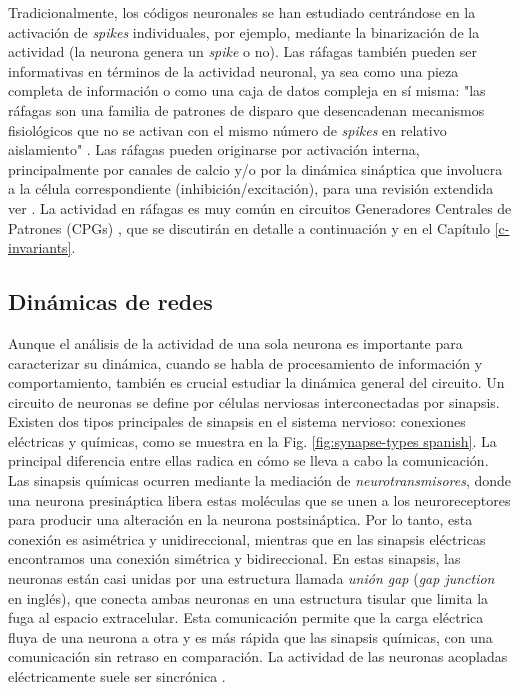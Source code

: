 Tradicionalmente, los códigos neuronales se han estudiado centrándose en la activación de \textit{spikes} individuales, por ejemplo, mediante la binarización de la actividad (la neurona genera un \textit{spike} o no). Las ráfagas también pueden ser informativas en términos de la actividad neuronal, ya sea como una pieza completa de información o como una caja de datos compleja en sí misma: "las ráfagas son una familia de patrones de disparo que desencadenan mecanismos fisiológicos que no se activan con el mismo número de \textit{spikes} en relativo aislamiento" \parencite{friedenberger_silences_2023}. Las ráfagas pueden originarse por activación interna, principalmente por canales de calcio y/o por la dinámica sináptica que involucra a la célula correspondiente (inhibición/excitación), para una revisión extendida ver \parencite{friedenberger_silences_2023}. La actividad en ráfagas es muy común en circuitos Generadores Centrales de Patrones (CPGs) \parencite{katz_evolution_2016,steuer_central_2018}, que se discutirán en detalle a continuación y en el Capítulo \ref{c-invariants}.

\subsection{Dinámicas de redes}

Aunque el análisis de la actividad de una sola neurona es importante para caracterizar su dinámica, cuando se habla de procesamiento de información y comportamiento, también es crucial estudiar la dinámica general del circuito. Un circuito de neuronas se define por células nerviosas interconectadas por sinapsis. Existen dos tipos principales de sinapsis en el sistema nervioso: conexiones eléctricas y químicas, como se muestra en la Fig. \ref{fig:synapse-types spanish}. La principal diferencia entre ellas radica en cómo se lleva a cabo la comunicación. Las sinapsis químicas ocurren mediante la mediación de \textit{neurotransmisores}, donde una neurona presináptica libera estas moléculas que se unen a los neuroreceptores para producir una alteración en la neurona postsináptica. Por lo tanto, esta conexión es asimétrica y unidireccional, mientras que en las sinapsis eléctricas encontramos una conexión simétrica y bidireccional. En estas sinapsis, las neuronas están casi unidas por una estructura llamada \textit{unión gap} (\textit{gap junction} en inglés), que conecta ambas neuronas en una estructura tisular que limita la fuga al espacio extracelular. Esta comunicación permite que la carga eléctrica fluya de una neurona a otra y es más rápida que las sinapsis químicas, con una comunicación sin retraso en comparación. La actividad de las neuronas acopladas eléctricamente suele ser sincrónica \parencite{levitan_neuron_2002}.

